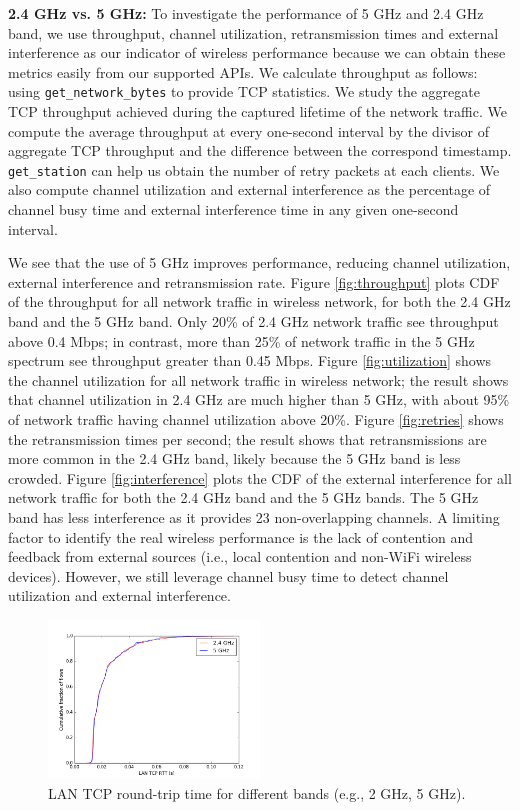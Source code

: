 \textbf{2.4 GHz vs. 5 GHz:} To investigate the performance of 5 GHz and 2.4 GHz band, we use throughput, channel utilization, retransmission times and external interference as our indicator of wireless performance because we can obtain these metrics easily from our supported APIs. We calculate throughput as follows: using \texttt{get\_network\_bytes} to provide TCP statistics. We study the aggregate TCP throughput achieved during the captured lifetime of the network traffic. We compute the average throughput at every one-second interval by the divisor of aggregate TCP throughput and the difference between the correspond timestamp. \texttt{get\_station} can help us obtain the number of retry packets at each clients. We also compute channel utilization and external interference as the percentage of channel busy time and external interference time in any given one-second interval. 

We see that the use of 5 GHz improves performance, reducing channel utilization, external interference and retransmission rate. Figure \ref{fig:throughput} plots CDF of the throughput for all network traffic in wireless network, for both the 2.4 GHz band and the 5 GHz band. Only 20\% of 2.4 GHz network traffic see throughput above 0.4 Mbps; in contrast, more than 25\% of network traffic in the 5 GHz spectrum see throughput greater than 0.45 Mbps. Figure \ref{fig:utilization} shows the channel utilization for all network traffic in wireless network; the result shows that channel utilization in 2.4 GHz are much higher than 5 GHz, with about 95\% of network traffic having channel utilization above 20\%. Figure \ref{fig:retries} shows the retransmission times per second; the result shows that retransmissions are more common in the 2.4 GHz band, likely because the 5 GHz band is less crowded. Figure \ref{fig:interference} plots the CDF of the external interference for all network traffic for both the 2.4 GHz band and the 5 GHz bands. The 5 GHz band has less interference as it provides 23 non-overlapping channels. A limiting factor to identify the real wireless performance is the lack of contention and feedback from external sources (i.e., local contention and non-WiFi wireless devices). However, we still leverage channel busy time to detect channel utilization and external interference.

\begin{figure}
\centering
\includegraphics[width=0.5\textwidth]{figure/tcp_rtt.png}
\caption{LAN TCP round-trip time for different bands (e.g., 2 GHz, 5 GHz).} 
\label{fig:tcprtt}
\end{figure}

